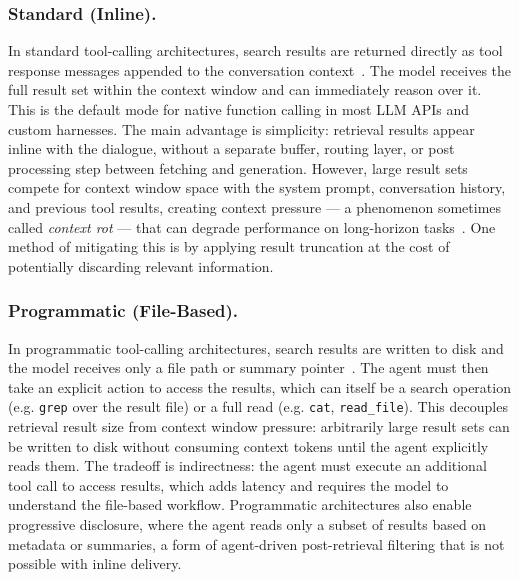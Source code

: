 \documentclass[sigconf,nonacm]{acmart}
\begin{document}
\subsubsection{Standard (Inline).}
In standard tool-calling architectures, search results are returned directly as tool response messages appended to the conversation context~\cite{schick2023toolformer,qin2023toolllm,patil2023gorilla}. The model receives the full result set within the context window and can immediately reason over it. This is the default mode for native function calling in most LLM APIs and custom harnesses. The main advantage is simplicity: retrieval results appear inline with the dialogue, without a separate buffer, routing layer, or post processing step between fetching and generation. However, large result sets compete for context window space with the system prompt, conversation history, and previous tool results, creating context pressure --- a phenomenon sometimes called \emph{context rot} --- that can degrade performance on long-horizon tasks~\cite{liu2023lostinmiddle}. One method of mitigating this is by applying result truncation at the cost of potentially discarding relevant information.

\subsubsection{Programmatic (File-Based).}
In programmatic tool-calling architectures, search results are written to disk and the model receives only a file path or summary pointer~\cite{packer2023memgpt,lumer2025toolsurvey}. The agent must then take an explicit action to access the results, which can itself be a search operation (e.g. \texttt{grep} over the result file) or a full read (e.g. \texttt{cat}, \texttt{read\_file}). This decouples retrieval result size from context window pressure: arbitrarily large result sets can be written to disk without consuming context tokens until the agent explicitly reads them. The tradeoff is indirectness: the agent must execute an additional tool call to access results, which adds latency and requires the model to understand the file-based workflow. Programmatic architectures also enable progressive disclosure, where the agent reads only a subset of results based on metadata or summaries, a form of agent-driven post-retrieval filtering that is not possible with inline delivery.


\end{document}
